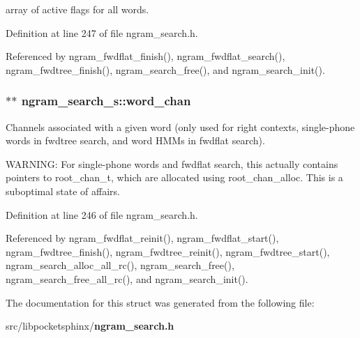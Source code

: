 array of active flags for all words. 



Definition at line 247 of file ngram\-\_\-search.\-h.



Referenced by ngram\-\_\-fwdflat\-\_\-finish(), ngram\-\_\-fwdflat\-\_\-search(), ngram\-\_\-fwdtree\-\_\-finish(), ngram\-\_\-search\-\_\-free(), and ngram\-\_\-search\-\_\-init().

\subsubsection[{word\-\_\-chan}]{$\ast$$\ast$ ngram\-\_\-search\-\_\-s\-::word\-\_\-chan}\label{structngram__search__s_a79deb7295a261cd82d2a6b48cb119e77}


Channels associated with a given word (only used for right contexts, single-\/phone words in fwdtree search, and word H\-M\-Ms in fwdflat search). 

W\-A\-R\-N\-I\-N\-G\-: For single-\/phone words and fwdflat search, this actually contains pointers to root\-\_\-chan\-\_\-t, which are allocated using root\-\_\-chan\-\_\-alloc. This is a suboptimal state of affairs. 

Definition at line 246 of file ngram\-\_\-search.\-h.



Referenced by ngram\-\_\-fwdflat\-\_\-reinit(), ngram\-\_\-fwdflat\-\_\-start(), ngram\-\_\-fwdtree\-\_\-finish(), ngram\-\_\-fwdtree\-\_\-reinit(), ngram\-\_\-fwdtree\-\_\-start(), ngram\-\_\-search\-\_\-alloc\-\_\-all\-\_\-rc(), ngram\-\_\-search\-\_\-free(), ngram\-\_\-search\-\_\-free\-\_\-all\-\_\-rc(), and ngram\-\_\-search\-\_\-init().



The documentation for this struct was generated from the following file\-:\begin{DoxyCompactItemize}
\item 
src/libpocketsphinx/{\bf ngram\-\_\-search.\-h}\end{DoxyCompactItemize}
